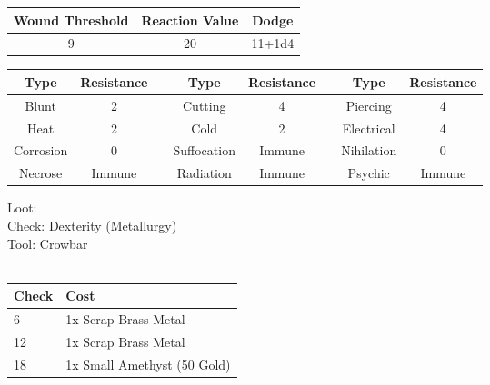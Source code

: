 \bigbreak
\begin{minipage}[H]{1\textwidth}
	\centering
	\begin{tabular}[c]{|c | c | c|}
		\hline
		Wound Threshold & Reaction Value & Dodge\\
		\hline
		9 & 20 & 11+1d4\\
		\hline
	\end{tabular}
\end{minipage}
\bigbreak
\noindent
\begin{minipage}[H]{1\textwidth}
	\centering
	\begin{tabular}[c]{|c | c | c | c | c | c | c | c|}  
		\hline
		Type & Resistance && Type & Resistance && Type & Resistance\\
		\hline
		Blunt & 2 && 
		Cutting & 4 && 
		Piercing & 4\\
		Heat & 2 && 
		Cold & 2 && 
		Electrical & 4\\
		Corrosion & 0 && 
		Suffocation & Immune && 
		Nihilation & 0 \\
		Necrose & Immune && 
		Radiation & Immune && 
		Psychic & Immune\\
		\hline
	\end{tabular}
\end{minipage}
\bigbreak
\noindent
Loot:\\
Check: Dexterity (Metallurgy)\\
Tool: Crowbar\\
\\
\begin{minipage}{0.8\textwidth}
	\begin{tabular}{|l | l|}
		\hline
		Check & Cost\\
		\hline
		6 & 1x Scrap Brass Metal\\
		12 & 1x Scrap Brass Metal\\
		18 & 1x Small Amethyst (50 Gold)\\
		\hline
	\end{tabular}
\end{minipage}
\pagebreak